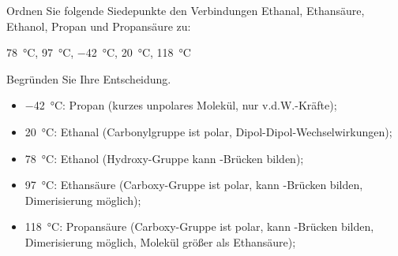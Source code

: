 \documentclass[DIV11]{scrartcl}
\begin{document}
\begin{question}[name=Siedepunkte und Struktur]
Ordnen Sie folgende Siedepunkte den Verbindungen Ethanal, Ethansäure, Ethanol,
Propan und Propansäure zu:

\SI{78}{\celsius}, \SI{97}{\celsius}, \SI{-42}{\celsius}, \SI{20}{\celsius},
\SI{118}{\celsius}

Begründen Sie Ihre Entscheidung.
\end{question}
\begin{solution}[name=Siedepunkte und Struktur]
\begin{itemize}
  \item \SI{-42}{\celsius}: Propan (kurzes unpolares Molekül, nur
    v.d.W.-Kräfte);
  \item \SI{20}{\celsius}: Ethanal (Carbonylgruppe ist polar,
    Dipol-Dipol-Wechselwirkungen);
  \item \SI{78}{\celsius}: Ethanol (Hydroxy-Gruppe kann -Brücken
    bilden);
  \item \SI{97}{\celsius}: Ethansäure (Carboxy-Gruppe ist polar, kann
    -Brücken bilden, Dimerisierung möglich);
  \item \SI{118}{\celsius}: Propansäure (Carboxy-Gruppe ist polar, kann
    -Brücken bilden, Dimerisierung möglich, Molekül größer als
    Ethansäure);
\end{itemize}
\end{solution}

\newpage
{}
\printsolutions
\end{document}
